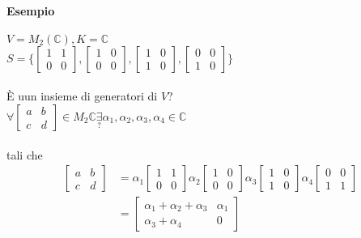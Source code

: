\paragraph{Esempio} $V=M_2(\mathbb{C}), K=\mathbb{C}$\\
$S=\Bigg\{    
    \begin{bmatrix}
        1 & 1 \\
        0 & 0
    \end{bmatrix}
    ,
    \begin{bmatrix}
        1 & 0 \\
        0 & 0
    \end{bmatrix}
    ,
    \begin{bmatrix}
        1 & 0 \\
        1 & 0
    \end{bmatrix}
    ,
    \begin{bmatrix}
        0 & 0 \\
        1 & 0
    \end{bmatrix}
\Bigg\}$\\\\
È uun insieme di generatori di $V$?\\
$\forall 
    \begin{bmatrix}
        a & b \\
        c & d
    \end{bmatrix}
\in M_2\mathbb{C}
\underset{?}{\exists}\alpha_1, \alpha_2, \alpha_3, \alpha_4 \in \mathbb{C}$\\\\
tali che
\begin{align*}
    \begin{bmatrix}
        a & b \\
        c & d
    \end{bmatrix}
    & = 
    \alpha_1
    \begin{bmatrix}
        1 & 1\\
        0 & 0
    \end{bmatrix}
    \alpha_2
    \begin{bmatrix}
        1 & 0\\
        0 & 0
    \end{bmatrix}
    \alpha_3
    \begin{bmatrix}
        1 & 0\\
        1 & 0
    \end{bmatrix}
    \alpha_4
    \begin{bmatrix}
        0 & 0\\
        1 & 1
    \end{bmatrix}
    \\
    & = 
    \begin{bmatrix}
        \alpha_1+\alpha_2 + \alpha_3 &  \alpha_1\\
            \alpha_3+\alpha_4 &  0
    \end{bmatrix}
\end{align*}
